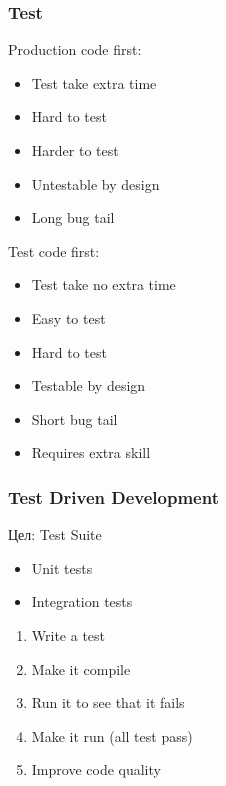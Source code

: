 
\begin{frame}
  \frametitle{Test}
  \begin{minipage}[t]{0.48\linewidth}
  Production code first:
  \begin{itemize}
     \item Test take extra time
     \item Hard to test
     \item Harder to test
     \item Untestable by design
     \item Long bug tail
  \end{itemize}
  \end{minipage}\hfill
  \begin{minipage}[t]{0.48\linewidth}
  Test code first:
  \begin{itemize}
     \item Test take no extra time
     \item Easy to test
     \item Hard to test
     \item Testable by design
     \item Short bug tail
     \item Requires extra skill
  \end{itemize}
  \end{minipage}
\end{frame}

\begin{frame}
  \frametitle{Test Driven Development}
    \begin{minipage}[t]{0.48\linewidth}
        Цел: Test Suite
        \begin{itemize}
            \item Unit tests
            \item Integration tests
        \end{itemize}
    \end{minipage}\hfill
    \begin{minipage}[t]{0.48\linewidth}
        \begin{enumerate} 
            \item Write a test
            \item Make it compile
            \item Run it to see that it fails
            \item Make it run (all test pass)
            \item Improve code quality
         \end{enumerate} 
    \end{minipage}
\end{frame}


